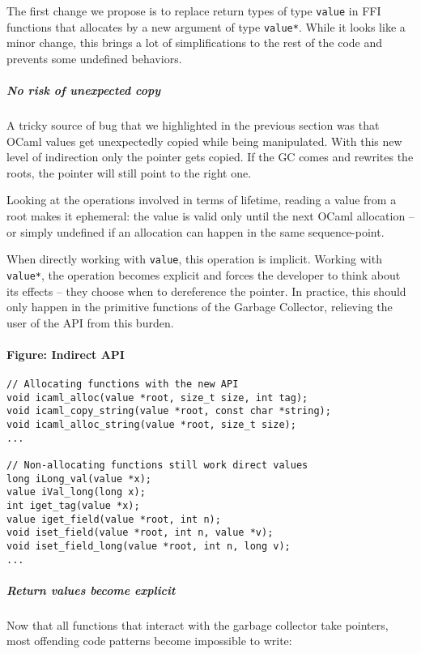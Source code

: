 \documentclass[a4paper]{easychair}
\begin{document}
The first change we propose is to replace return types of type
\texttt{value} in FFI functions that allocates by a new argument of type
\texttt{value*}. While it looks like a minor change, this brings a lot
of simplifications to the rest of the code and prevents some undefined
behaviors.

\subparagraph{No risk of unexpected copy}

A tricky source of bug that we highlighted in the previous section was
that OCaml values get unexpectedly copied while being manipulated. With
this new level of indirection only the pointer gets copied. If the GC
comes and rewrites the roots, the pointer will still point to the right
one.

Looking at the operations involved in terms of lifetime, reading a value
from a root makes it ephemeral: the value is valid only until the next
OCaml allocation -- or simply undefined if an allocation can happen in
the same sequence-point.

When directly working with \texttt{value}, this operation is implicit.
Working with \texttt{value*}, the operation becomes explicit and forces
the developer to think about its effects -- they choose when to
dereference the pointer. In practice, this should only happen in the
primitive functions of the Garbage Collector, relieving the user of the
API from this burden.

\paragraph{Figure: Indirect API}

\begin{lstlisting}[]
// Allocating functions with the new API
void icaml_alloc(value *root, size_t size, int tag);
void icaml_copy_string(value *root, const char *string);
void icaml_alloc_string(value *root, size_t size);
...
    
// Non-allocating functions still work direct values
long iLong_val(value *x);
value iVal_long(long x);
int iget_tag(value *x);
value iget_field(value *root, int n);
void iset_field(value *root, int n, value *v);
void iset_field_long(value *root, int n, long v);
...
\end{lstlisting}

\subparagraph{Return values become explicit}

Now that all functions that interact with the garbage collector take
pointers, most offending code patterns become impossible to write:
\end{document}
